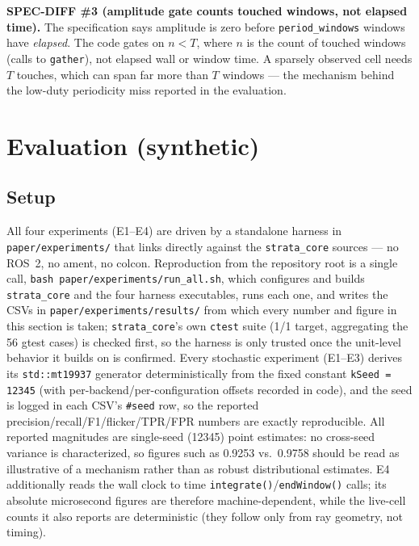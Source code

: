 \documentclass[conference]{IEEEtran}
\begin{document}
\textbf{SPEC-DIFF \#3 (amplitude gate counts touched windows, not elapsed time).} The
specification says amplitude is zero before \texttt{period\_windows} windows have
\emph{elapsed}. The code gates on $n<T$, where $n$ is the count of touched windows
(calls to \texttt{gather}), not elapsed wall or window time. A sparsely observed cell
needs $T$ touches, which can span far more than $T$ windows --- the mechanism
behind the low-duty periodicity miss reported in the evaluation.

\section{Evaluation (synthetic)}
\label{sec:eval}

\subsection{Setup}

All four experiments (E1--E4) are driven by a standalone harness in
\texttt{paper/experiments/} that links directly against the \texttt{strata\_core} sources ---
no ROS~2, no ament, no colcon. Reproduction from the repository root is a
single call, \texttt{bash paper/experiments/run\_all.sh}, which configures and builds
\texttt{strata\_core} and the four harness executables, runs each one, and writes the
CSVs in \texttt{paper/experiments/results/} from which every number and figure in
this section is taken; \texttt{strata\_core}'s own \texttt{ctest} suite (1/1 target,
aggregating the 56 gtest cases) is checked
first, so the harness is only trusted once the unit-level behavior it builds
on is confirmed. Every stochastic experiment (E1--E3) derives its
\texttt{std::mt19937} generator deterministically from the fixed constant
\texttt{kSeed = 12345} (with per-backend/per-configuration offsets recorded
in code), and the seed is logged in each
CSV's \texttt{\#seed} row, so the reported precision/recall/F1/flicker/TPR/FPR
numbers are exactly reproducible. All reported magnitudes are single-seed
(12345) point estimates: no cross-seed variance is characterized, so figures
such as 0.9253 vs.\ 0.9758 should be read as illustrative of a mechanism
rather than as robust distributional estimates. E4 additionally reads the wall clock to
time \texttt{integrate()}/\texttt{endWindow()} calls; its absolute microsecond figures are
therefore machine-dependent, while the live-cell counts it also reports are
deterministic (they follow only from ray geometry, not timing).
\end{document}

